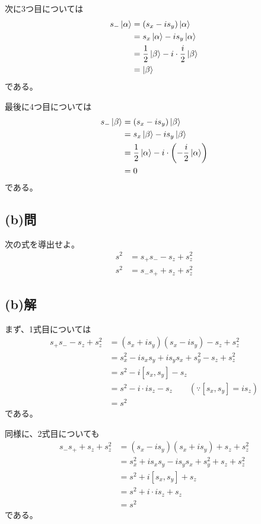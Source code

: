 次に3つ目については
\begin{align}
	s_- \ket{\alpha}
&=
	(s_x -i s_y) \ket{\alpha} \\
%
%
&=
	s_x \ket{\alpha}
	-
	i s_y \ket{\alpha} \\
%
%
&=
	\frac{1}{2} \ket{\beta}
	-
	i \cdot \frac{i}{2} \ket{\beta} \\
%
%
&=
	\ket{\beta}
\end{align}
である。

最後に4つ目については
\begin{align}
	s_- \ket{\beta}
&=
	(s_x -i s_y) \ket{\beta} \\
%
%
&=
	s_x \ket{\beta}
	-
	i s_y \ket{\beta} \\
%
%
&=
	\frac{1}{2} \ket{\alpha}
	-
	i \cdot\left(-\frac{i}{2}\ket{\alpha}\right) \\
%
%
&=
	0
\end{align}
である。


\subsection{(b)問}
次の式を導出せよ。
\begin{align}
	s^2
&=
	s_+ s_-
	-
	s_z
	+
	s_z^2 \\
%
%
	s^2
&=
	s_- s_+
	+
	s_z
	+
	s_z^2
\end{align}


\subsection{(b)解}
まず、1式目については
\begin{align}
	s_+ s_-
	-
	s_z
	+
	s_z^2
&=
	(s_x +is_y)
	(s_x -is_y)
	-
	s_z
	+
	s_z^2 \\
%
%
&=
	s_x^2
	-
	i s_x s_y
	+
	i s_y s_x
	+
	s_y^2
	-
	s_z
	+
	s_z^2 \\
%
%
&=
	s^2
	-
	i [s_x,s_y]
	-
	s_z \\
%
%
&=
	s^2
	-
	i \cdot is_z
	-
	s_z
	\qquad
	(\because [s_x,s_y]=is_z) \\
%
%
&=
	s^2
\end{align}
である。

同様に、2式目についても
\begin{align}
	s_- s_+
	+
	s_z
	+
	s_z^2
%
%
&=
	(s_x -is_y)
	(s_x +is_y)
	+
	s_z
	+
	s_z^2 \\
%
%
&=
	s_x^2
	+
	i s_x s_y
	-
	i s_y s_x
	+
	s_y^2
	+
	s_z
	+
	s_z^2 \\
%
%
&=
	s^2
	+
	i [s_x,s_y]
	+
	s_z \\
%
%
&=
	s^2
	+
	i \cdot i s_z
	+
	s_z \\
%
%
&=
	s^2
\end{align}
である。



